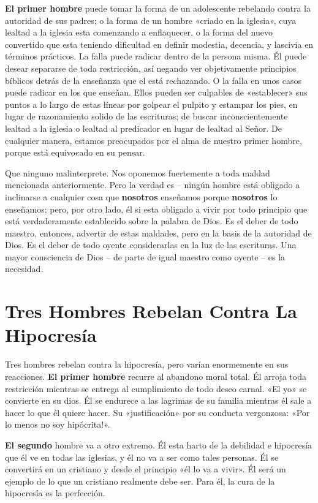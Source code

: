 \documentclass[12pt, twoside, openright]{book}
\begin{document}
\textbf{El primer hombre} puede tomar la forma de un adolescente rebelando contra la autoridad de sus padres; o la forma de un hombre «criado en la iglesia», cuya lealtad a la iglesia esta comenzando a enflaquecer, o la forma del nuevo convertido que esta teniendo dificultad en definir modestia, decencia, y lascivia en términos prácticos. La falla puede radicar dentro de la persona misma. Él puede desear separarse de toda restricción, así negando ver objetivamente principios bíblicos detrás de la enseñanza que el está rechazando. O la falla en unos casos puede radicar en los que enseñan. Ellos pueden ser culpables de «establecer» sus puntos a lo largo de estas líneas por golpear el pulpito y estampar los pies, en lugar de razonamiento solido de las escrituras; de buscar inconscientemente lealtad a la iglesia o lealtad al predicador en lugar de lealtad al Señor. De cualquier manera, estamos preocupados por el alma de nuestro primer hombre, porque está equivocado en su pensar.

Que ninguno malinterprete. Nos oponemos fuertemente a toda maldad mencionada anteriormente. Pero la verdad es – ningún hombre está obligado a inclinarse a cualquier cosa que \textbf{nosotros} enseñamos porque \textbf{nosotros} lo enseñamos; pero, por otro lado, él si esta obligado a vivir por todo principio que está verdaderamente establecido sobre la palabra de Dios. Es el deber de todo maestro, entonces, advertir de estas maldades, pero en la basis de la autoridad de Dios. Es el deber de todo oyente considerarlas en la luz de las escrituras. Una mayor consciencia de Dios – de parte de igual maestro como oyente – es la necesidad. 

\section{Tres Hombres Rebelan Contra La Hipocresía}
Tres hombres rebelan contra la hipocresía, pero varían enormemente en sus reacciones. \textbf{El primer hombre} recurre al abandono moral total. Él arroja toda restricción mientras se entrega al cumplimiento de todo deseo carnal. «El yo» se convierte en su dios. Él se endurece a las lagrimas de su familia mientras él sale a hacer lo que él quiere hacer. Su «justificación» por su conducta vergonzosa: «Por lo menos no soy hipócrita!».

\textbf{El segundo} hombre va a otro extremo. Él esta harto de la debilidad e hipocresía que él ve en todas las iglesias, y él no va a ser como tales personas. Él se convertirá en un cristiano y desde el principio «él lo va a vivir». Él será un ejemplo de lo que un cristiano realmente debe ser. Para él, la cura de la hipocresía es la perfección. 
\end{document}
